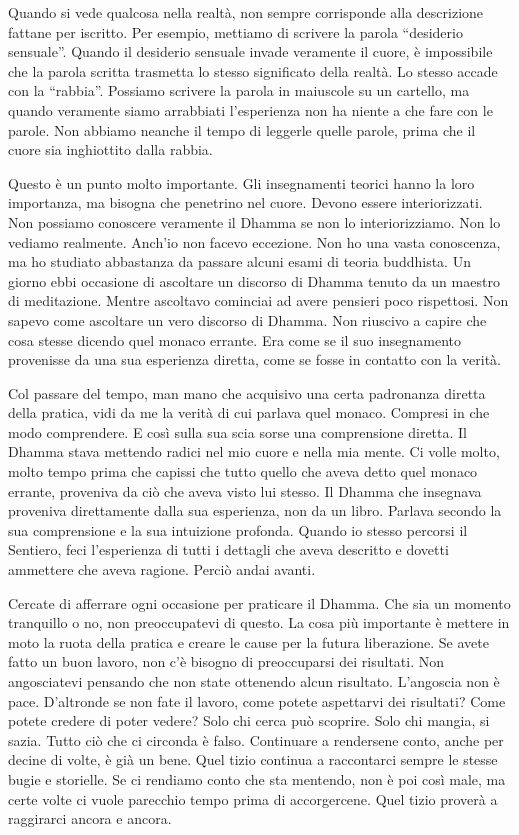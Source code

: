 Quando si vede qualcosa nella realtà, non sempre corrisponde alla
descrizione fattane per iscritto. Per esempio, mettiamo di scrivere la
parola ``desiderio sensuale''. Quando il desiderio sensuale invade
veramente il cuore, è impossibile che la parola scritta trasmetta lo
stesso significato della realtà. Lo stesso accade con la ``rabbia''.
Possiamo scrivere la parola in maiuscole su un cartello, ma quando
veramente siamo arrabbiati l'esperienza non ha niente a che fare con le
parole. Non abbiamo neanche il tempo di leggerle quelle parole, prima
che il cuore sia inghiottito dalla rabbia.

Questo è un punto molto importante. Gli insegnamenti teorici hanno la
loro importanza, ma bisogna che penetrino nel cuore. Devono essere
interiorizzati. Non possiamo conoscere veramente il Dhamma se non lo
interiorizziamo. Non lo vediamo realmente. Anch'io non facevo eccezione.
Non ho una vasta conoscenza, ma ho studiato abbastanza da passare alcuni
esami di teoria buddhista. Un giorno ebbi occasione di ascoltare un
discorso di Dhamma tenuto da un maestro di meditazione. Mentre ascoltavo
cominciai ad avere pensieri poco rispettosi. Non sapevo come ascoltare
un vero discorso di Dhamma. Non riuscivo a capire che cosa stesse
dicendo quel monaco errante. Era come se il suo insegnamento provenisse
da una sua esperienza diretta, come se fosse in contatto con la verità.

Col passare del tempo, man mano che acquisivo una certa padronanza
diretta della pratica, vidi da me la verità di cui parlava quel monaco.
Compresi in che modo comprendere. E così sulla sua scia sorse una
comprensione diretta. Il Dhamma stava mettendo radici nel mio cuore e
nella mia mente. Ci volle molto, molto tempo prima che capissi che tutto
quello che aveva detto quel monaco errante, proveniva da ciò che aveva
visto lui stesso. Il Dhamma che insegnava proveniva direttamente dalla
sua esperienza, non da un libro. Parlava secondo la sua comprensione e
la sua intuizione profonda. Quando io stesso percorsi il Sentiero, feci
l'esperienza di tutti i dettagli che aveva descritto e dovetti ammettere
che aveva ragione. Perciò andai avanti.

Cercate di afferrare ogni occasione per praticare il Dhamma. Che sia un
momento tranquillo o no, non preoccupatevi di questo. La cosa più
importante è mettere in moto la ruota della pratica e creare le cause
per la futura liberazione. Se avete fatto un buon lavoro, non c'è
bisogno di preoccuparsi dei risultati. Non angosciatevi pensando che non
state ottenendo alcun risultato. L'angoscia non è pace. D'altronde se
non fate il lavoro, come potete aspettarvi dei risultati? Come potete
credere di poter vedere? Solo chi cerca può scoprire. Solo chi mangia,
si sazia. Tutto ciò che ci circonda è falso. Continuare a rendersene
conto, anche per decine di volte, è già un bene. Quel tizio continua a
raccontarci sempre le stesse bugie e storielle. Se ci rendiamo conto che
sta mentendo, non è poi così male, ma certe volte ci vuole parecchio
tempo prima di accorgercene. Quel tizio proverà a raggirarci ancora e
ancora.

